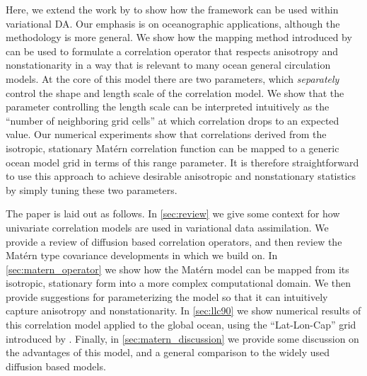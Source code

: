 Here, we extend the work by \citet{RSSB:RSSB777}
to show how the framework can be used within variational DA.
Our emphasis is on oceanographic applications, although the methodology is more
general.
We show how the mapping method introduced by \citet{RSSB:RSSB777}
can be used to formulate a correlation operator that respects anisotropy and
nonstationarity in a way that is relevant to many ocean general circulation
models.
At the core of this model there are two parameters, which \textit{separately}
control the shape and length scale of the correlation model.
We show that the parameter controlling the length scale can be interpreted
intuitively as the ``number of neighboring grid cells'' at which correlation
drops to an expected value.
Our numerical experiments show that correlations derived from the isotropic,
stationary Mat\'ern correlation function can be mapped to a generic ocean model
grid in terms of this range parameter.
It is therefore straightforward to use this approach to achieve desirable
anisotropic and nonstationary statistics by simply tuning these two
parameters.

The paper is laid out as follows.
In \cref{sec:review} we give some context for how univariate correlation models
are used in variational data assimilation.
We provide a review of diffusion based correlation operators, and
then review the Mat\'ern type covariance developments in \citet{RSSB:RSSB777}
which we build on.
In \cref{sec:matern_operator} we show how the Mat\'ern model can be mapped from
its isotropic, stationary form into a more complex computational domain.
We then provide suggestions for parameterizing the model so that it can
intuitively capture anisotropy and nonstationarity.
In \cref{sec:llc90} we show numerical results of this correlation model
applied to the global ocean, using the ``Lat-Lon-Cap'' grid introduced by
\citet{forgetECCOv4}.
Finally, in \cref{sec:matern_discussion} we provide some discussion on the
advantages of this model, and a general comparison to the widely used
diffusion based models.
